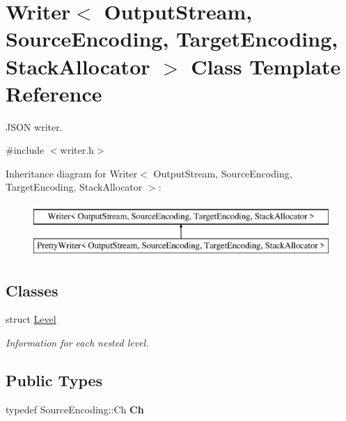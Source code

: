 \hypertarget{class_writer}{}\section{Writer$<$ Output\+Stream, Source\+Encoding, Target\+Encoding, Stack\+Allocator $>$ Class Template Reference}
\label{class_writer}


J\+S\+ON writer.  




{\ttfamily \#include $<$writer.\+h$>$}

Inheritance diagram for Writer$<$ Output\+Stream, Source\+Encoding, Target\+Encoding, Stack\+Allocator $>$\+:\begin{figure}[H]
\begin{center}
\leavevmode
\includegraphics[height=2.000000cm]{class_writer}
\end{center}
\end{figure}
\subsection*{Classes}
\begin{DoxyCompactItemize}
\item 
struct \hyperlink{struct_writer_1_1_level}{Level}
\begin{DoxyCompactList}\small\item\em Information for each nested level. \end{DoxyCompactList}\end{DoxyCompactItemize}
\subsection*{Public Types}
\begin{DoxyCompactItemize}
\item 
typedef Source\+Encoding\+::\+Ch {\bfseries Ch}\hypertarget{class_writer_a5ba0d623162839460024b517fc2d5868}{}\label{class_writer_a5ba0d623162839460024b517fc2d5868}

\end{DoxyCompactItemize}
